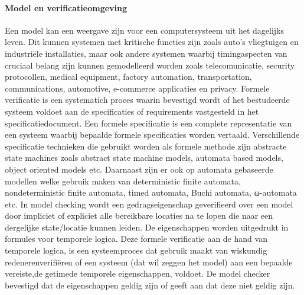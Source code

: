 \documentclass{article}
\begin{document}
\paragraph{Model en verificatieomgeving}
Een model kan een weergave zijn voor een computersysteem uit het dagelijks leven. Dit kunnen systemen met kritische functies zijn zoals auto's vliegtuigen en industriële installaties, maar ook andere systemen waarbij timingaspecten van cruciaal belang zijn  kunnen gemodelleerd worden zoals telecomunicatie, security protocollen,  medical equipment, factory automation, transportation,
communications, automotive, e-commerce applicaties en privacy.
Formele verificatie is een systematich proces waarin bevestigd wordt of het bestudeerde systeem voldoet aan de specificaties of requirements  vastgesteld in het specificatiedocument.
Een formele specificatie is een complete representatie van een systeem  waarbij bepaalde formele specificaties worden vertaald. Verschillende specificatie technieken die  gebruikt worden als  formele methode zijn abstracte state machines zoals abstract state machine models, automata based models, object oriented models etc. Daarnaast zijn er ook op automata gebaseerde modellen welke gebruik maken van deterministic finite automata, nondeterministic finite automata, timed automata, Buchi automata, ω-automata etc.  
In model checking wordt een gedragseigenschap geverifieerd over een model door impliciet of expliciet alle bereikbare locaties na te lopen die naar een dergelijke state/locatie kunnen leiden. De  eigenschappen worden uitgedrukt in formules voor temporele logica. 
Deze formele verificatie aan de hand van temporele logica, is een systeemproces dat gebruik maakt van wiskundig redenerenverifiëren of een systeem (dat wil zeggen het model) aan een bepaalde vereiste,de getimede temporele eigenschappen, voldoet.
De model checker bevestigd dat de eigenschappen geldig zijn of geeft aan dat deze niet geldig zijn.
%
%
\end{document}
